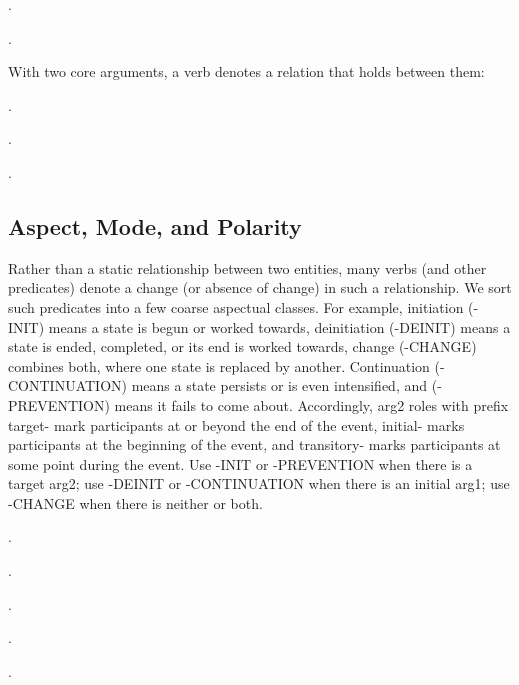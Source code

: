 \documentclass[a4paper]{article}
\newcommand{\fr}[1]{\textsf{#1}}
\newcommand{\frs}[1]{\mbox{\textsf{#1}}} %
\newcommand{\rl}[1]{\textsf{#1}}
\begin{document}
\ex.

\ex.

With two core arguments, a verb denotes a relation that holds between them:

\ex.

\ex.

\ex.


\newpage\subsection{Aspect, Mode, and Polarity}
\label{sec:aspect-mode-polarity}

Rather than a static relationship between two entities, many verbs (and other
predicates) denote a change (or absence of change) in such a relationship. We
sort such predicates into a few coarse aspectual classes. For example,
initiation (\frs{-INIT}) means a state is begun or worked towards, deinitiation
(\frs{-DEINIT}) means a state is ended, completed, or its end is worked
towards, change (\frs{-CHANGE}) combines both, where one state is replaced by
another. Continuation (\frs{-CONTINUATION}) means a state persists or is even
intensified, and (\frs{-PREVENTION}) means it fails to come about.
Accordingly, arg2 roles with prefix \rl{target-} mark participants at or beyond
the end of the event, \rl{initial-} marks participants at the beginning of the
event, and \rl{transitory-} marks participants at some point during the event.
Use \fr{-INIT} or \fr{-PREVENTION} when there is a target arg2; use
\fr{-DEINIT} or \fr{-CONTINUATION} when there is an initial arg1; use
\fr{-CHANGE} when there is neither or both.

\ex.

\ex.

\ex.

\ex.

\ex.
\end{document}
